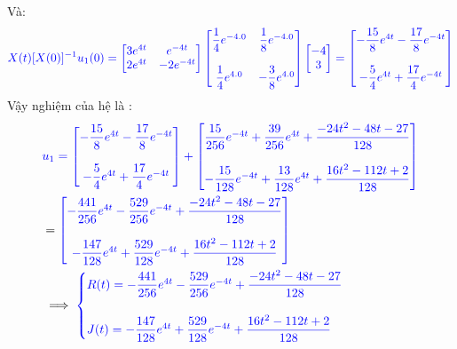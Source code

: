 \documentclass[a4paper]{article}
\begin{document}
 Và: 
 \begin{align}
 \textcolor{blue}{X(t)[X(0)]^{-1}u_1(0)=\begin{bmatrix} 3e^{4t} & e^{-4t}\\ 2e^{4t} & -2e^{-4t} \end{bmatrix}\begin{bmatrix} 
 \dfrac{1}{4}e^{-4.0} & \dfrac{1}{8}e^{-4.0}\\\\ \dfrac{1}{4}e^{4.0} & -\dfrac{3}{8}e^{4.0} \end{bmatrix} \begin{bmatrix} -4 \\ 3 \end{bmatrix} = \begin{bmatrix} -\dfrac{15}{8}e^{4t}- \dfrac{17}{8}e^{-4t}\\\\ -\dfrac{5}{4}e^{4t} +\dfrac{17}{4}e^{-4t} \end{bmatrix}}
 \end{align}
 Vậy nghiệm của hệ là :
 \begin{align}
  & \textcolor{blue}{  u_1=\begin{bmatrix} -\dfrac{15}{8}e^{4t}- \dfrac{17}{8}e^{-4t}\\\\ -\dfrac{5}{4}e^{4t} +\dfrac{17}{4}e^{-4t} \end{bmatrix}+\begin{bmatrix} \dfrac{15}{256}e^{-4t}+ \dfrac{39}{256}e^{4t}+\dfrac{-24t^{2}-48t-27}{128}  \\\\ -\dfrac{15}{128}e^{-4t}+\dfrac{13}{128}e^{4t}+\dfrac{16t^{2}-112t+2}{128}\end{bmatrix}}\\&=
  \textcolor{blue}{
  \begin{bmatrix} -\dfrac{441}{256}e^{4t}-\dfrac{529}{256}e^{-4t} +\dfrac{-24t^{2}-48t-27}{128}  \\\\ -\dfrac{147}{128}e^{4t}+\dfrac{529}{128}e^{-4t}+\dfrac{16t^{2}-112t+2}{128}\end{bmatrix}}\\
 &\implies\textcolor{blue}{  \begin{cases}
     \textcolor{blue}
{R(t)=-\dfrac{441}{256}e^{4t}-\dfrac{529}{256}e^{-4t} +\dfrac{-24t^{2}-48t-27}{128} }\\\\\textcolor{blue}
{J(t)=-\dfrac{147}{128}e^{4t}+\dfrac{529}{128}e^{-4t}+\dfrac{16t^{2}-112t+2}{128}}
\end{cases}}
 \end{align}
\end{document}
